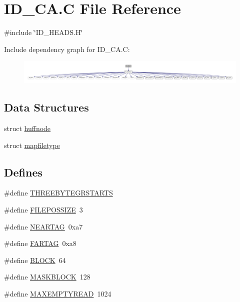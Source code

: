 \hypertarget{ID__CA_8C}{
\section{ID\_\-CA.C File Reference}
\label{ID__CA_8C}
}
{\ttfamily \#include \char`\"{}ID\_\-HEADS.H\char`\"{}}\par
Include dependency graph for ID\_\-CA.C:
\nopagebreak
\begin{figure}[H]
\begin{center}
\leavevmode
\includegraphics[width=400pt]{ID__CA_8C__incl}
\end{center}
\end{figure}
\subsection*{Data Structures}
\begin{DoxyCompactItemize}
\item 
struct \hyperlink{structhuffnode}{huffnode}
\item 
struct \hyperlink{structmapfiletype}{mapfiletype}
\end{DoxyCompactItemize}
\subsection*{Defines}
\begin{DoxyCompactItemize}
\item 
\#define \hyperlink{ID__CA_8C_a21db63522efe6d7a023778ae6a288f34}{THREEBYTEGRSTARTS}
\item 
\#define \hyperlink{ID__CA_8C_a6ec6ce39ad4745cc6276d6b7708183dc}{FILEPOSSIZE}~3
\item 
\#define \hyperlink{ID__CA_8C_ae6cc998927a70622236023a6afd3baa3}{NEARTAG}~0xa7
\item 
\#define \hyperlink{ID__CA_8C_a8bab425cc3ee80e6da6376848fa5ede0}{FARTAG}~0xa8
\item 
\#define \hyperlink{ID__CA_8C_a52220397ecea855b3a99746e451426e1}{BLOCK}~64
\item 
\#define \hyperlink{ID__CA_8C_ad081e7628ee9025fbe6b3bbef4dbf828}{MASKBLOCK}~128
\item 
\#define \hyperlink{ID__CA_8C_a935ef893851d6e31fa292608599c5296}{MAXEMPTYREAD}~1024
\end{DoxyCompactItemize}
